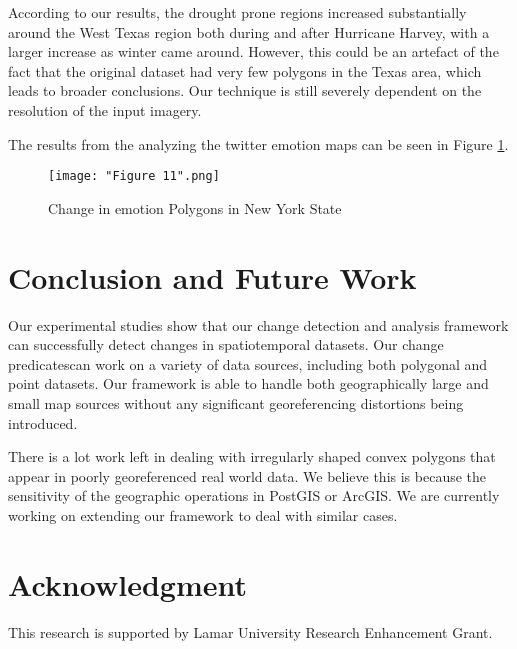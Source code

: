 \documentclass[conference]{IEEEtran}
\begin{document}
According to our results, the drought prone regions increased substantially around the West Texas region both during and after Hurricane Harvey, with a larger increase as winter came around. However, this could be an artefact of the fact that the original dataset had very few polygons in the Texas area, which leads to broader conclusions. Our technique is still severely dependent on the resolution of the input imagery.


The results from the analyzing the twitter emotion maps can be seen in Figure \ref{Figure 11}.

\begin{figure}[h]
\centerline{\texttt{[image: "Figure 11".png]}}
\caption{Change in emotion Polygons in New York State}
\label{Figure 11}
\end{figure}

\section{Conclusion and Future Work}

Our experimental studies show that our change detection and analysis framework can successfully detect changes in spatiotemporal datasets. Our change predicatescan work on a variety of data sources, including both polygonal and point datasets. Our framework is able to handle both geographically large and small map sources without any significant georeferencing distortions being introduced.
 
There is a lot work left in dealing with irregularly shaped convex polygons that appear in poorly georeferenced real world data. We believe this is because the sensitivity of the geographic operations in PostGIS or ArcGIS. We are currently working on extending our framework to deal with similar cases.

\section*{Acknowledgment}

This research is supported by Lamar University Research Enhancement Grant.
\end{document}
